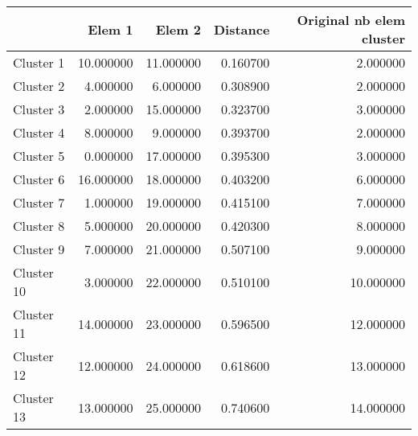 \begin{tabular}{lrrrr}
\toprule
 & Elem 1 & Elem 2 & Distance & Original nb elem cluster \\
\midrule
Cluster 1 & 10.000000 & 11.000000 & 0.160700 & 2.000000 \\
Cluster 2 & 4.000000 & 6.000000 & 0.308900 & 2.000000 \\
Cluster 3 & 2.000000 & 15.000000 & 0.323700 & 3.000000 \\
Cluster 4 & 8.000000 & 9.000000 & 0.393700 & 2.000000 \\
Cluster 5 & 0.000000 & 17.000000 & 0.395300 & 3.000000 \\
Cluster 6 & 16.000000 & 18.000000 & 0.403200 & 6.000000 \\
Cluster 7 & 1.000000 & 19.000000 & 0.415100 & 7.000000 \\
Cluster 8 & 5.000000 & 20.000000 & 0.420300 & 8.000000 \\
Cluster 9 & 7.000000 & 21.000000 & 0.507100 & 9.000000 \\
Cluster 10 & 3.000000 & 22.000000 & 0.510100 & 10.000000 \\
Cluster 11 & 14.000000 & 23.000000 & 0.596500 & 12.000000 \\
Cluster 12 & 12.000000 & 24.000000 & 0.618600 & 13.000000 \\
Cluster 13 & 13.000000 & 25.000000 & 0.740600 & 14.000000 \\
\bottomrule
\end{tabular}
